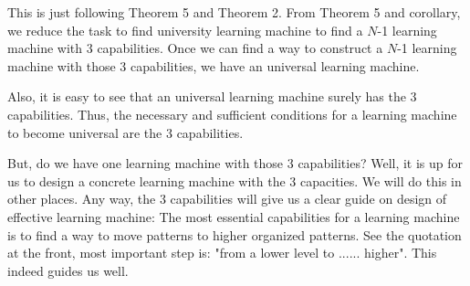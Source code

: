 This is just following Theorem 5 and Theorem 2. From Theorem 5 and corollary, we reduce the task to find university learning machine to find a $N$-1 learning machine with 3 capabilities. Once we can find a way to construct a $N$-1 learning machine with those 3 capabilities, we have an universal learning machine. 

Also, it is easy to see that an universal learning machine surely has the 3 capabilities. Thus, the necessary and sufficient conditions for a learning machine to become universal are the 3 capabilities. 

But, do we have one learning machine with those 3 capabilities? Well, it is up for us to design a concrete learning machine with the 3 capacities. We will do this in other places. Any way, the 3 capabilities will give us a clear guide on design of effective learning machine: The most essential capabilities for a learning machine is to find a way to move patterns to higher organized patterns. See the quotation at the front, most important step is: "from a lower level to ...... higher". This indeed guides us well.




